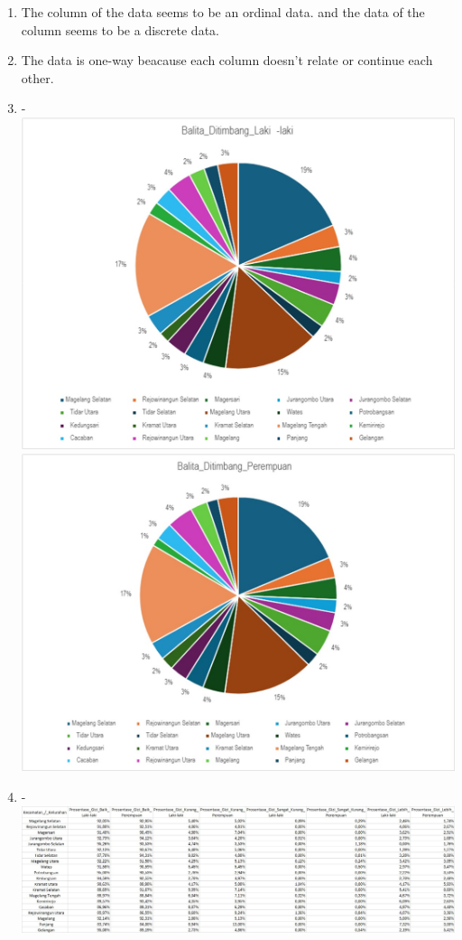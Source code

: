 \documentclass[12pt,titlepage]{article}
\begin{document}
\begin{enumerate}
    \item The column of the data seems to be an ordinal data. and the data of the column seems to be a discrete data.
    \item The data is one-way beacause each column doesn't relate or continue each other.
    \newpage
    \item - \\ \includegraphics[width=.9\textwidth]{images/figures/Balita_Ditimbang_Laki-laki.jpeg} \\ \includegraphics[width=.9\textwidth]{images/figures/Balita_Ditimbang_Perempuan.jpeg}
    \newpage
    \item - \\ \includegraphics[width=.9\textwidth]{images/figures/Prosentase_Gizi.jpeg}

\end{enumerate}
\end{document}
